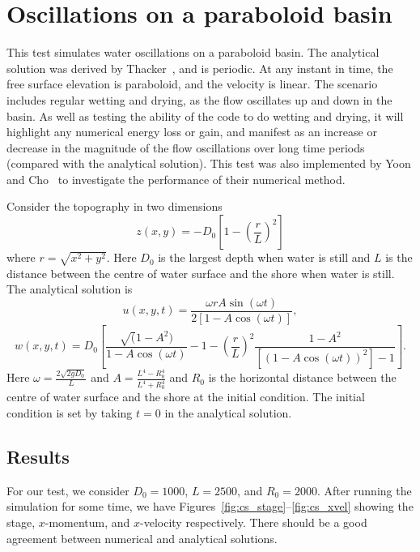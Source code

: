 \section{Oscillations on a paraboloid basin}
This test simulates water oscillations on a paraboloid basin. The analytical solution was derived by Thacker~\cite{Thacker1981}, and is periodic. At any instant in time, the free surface elevation is paraboloid, and the velocity is linear. The scenario includes regular wetting and drying, as the flow oscillates up and down in the basin. As well as testing the ability of the code to do wetting and drying, it will highlight any numerical energy loss or gain, and manifest as an increase or decrease in the magnitude of the flow oscillations over long time periods (compared with the analytical solution). This test was also implemented by Yoon and Cho~\cite{YC2001} to investigate the performance of their numerical method.

Consider the topography in two dimensions
\begin{equation}
z(x,y) = -D_0\left[1 -\left(\frac{r}{L}\right)^2\right]
\end{equation}
where $r=\sqrt{x^2 + y^2}$. Here $D_0$ is the largest depth when water is still and $L$ is the distance between the centre of water surface and the shore when water is still.
The analytical solution is 
\begin{equation}
u(x,y,t) = \frac{\omega r A \sin{(\omega t)}}{ 2 \left[1 -A \cos(\omega t)\right] },
\end{equation}
\begin{equation}
w(x,y,t) = D_0 \left[\frac{\sqrt(1-A^2)}{1-A\cos(\omega t)}  -1 
-\left( \frac{r}{L}\right)^2 \frac{1-A^2}{[(1-A\cos(\omega t))^2]-1} \right].
\end{equation}
Here $\omega=\frac{2\sqrt{2 g D_0}}{L}$ and $A = \frac{L^4 - R_0^4}{L^4 + R_0^4}$ and $R_0$ is the horizontal distance between the centre of water surface and the shore at the initial condition.
The initial condition is set by taking $t=0$ in the analytical solution.

\subsection{Results}
For our test, we consider $D_0=1000$, $L=2500$, and $R_0=2000$.
After running the simulation for some time, we have Figures~\ref{fig:cs_stage}--\ref{fig:cs_xvel} showing the stage, $x$-momentum, and $x$-velocity respectively. There should be a good agreement between numerical and analytical solutions.

